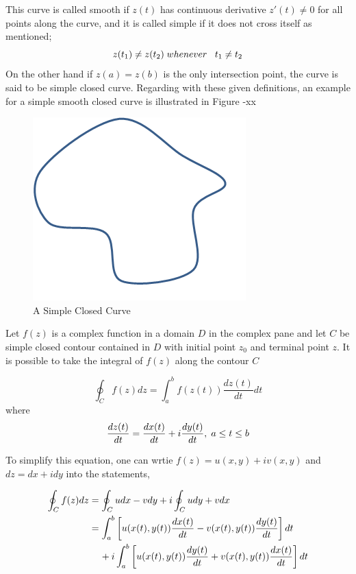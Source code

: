 \documentclass[twoside]{article}
\begin{document}
		This curve is called smooth if $z(t)$ has continuous derivative $z'(t) \neq 0$ for all points along the curve, and it is called simple if it does not cross itself as mentioned;
		\begin{equation}
z(t_1) \neq z(t_2)   \hspace{0.1cm} whenever   \hspace{0.3cm} t_1\neq t_2
		\end{equation}
		On the other hand if  $z(a)=z(b)$ is the only intersection point, the curve is said to be simple closed curve. Regarding with these given definitions, an example for a  simple smooth closed curve is illustrated in Figure -xx
			\begin{figure}[H]
				\caption{A Simple Closed Curve}
				\centering
				\includegraphics[scale = 0.60]{simple_closed_curve}
			\end{figure}

		
		
		Let $f(z)$ is a complex function in a domain $D$ in the complex pane and let $C$ be simple closed contour contained in $D$ with initial point $z_0$ and terminal point  $z$. It is possible to take the integral of $f(z)$ along the contour $C$
		
		\begin{equation}
    \oint_C f(z) dz = \int_{a}^{b} f(z(t))\frac{dz(t)}{dt} dt
		\end{equation}
		where
		\begin{equation}
\frac{dz(t)}{dt} = \frac{dx(t)}{dt} + i\frac{dy(t)}{dt},   \hspace{0.1cm} a\leq t\leq b
		\end{equation}
		
		To simplify this equation, one can wrtie $f(z) = u(x,y) + iv(x,y)$ and $dz = dx + idy$ into the statements,
		
		\begin{align*}
\oint_C f(z)dz & = \oint_C u dx - v dy + i \oint_C u dy + v dx \\
                        &= \int_{a}^{b}\left[u(x(t),y(t) )\frac{dx(t)}{dt} - v(x(t),y(t) )\frac{dy(t)}{dt}\right]dt\\
                        & \hspace{0.4cm} + i\int_{a}^{b} \left[u(x(t),y(t) )\frac{dy(t)}{dt} + v(x(t),y(t) )\frac{dx(t)}{dt}\right]dt
		\end{align*}
		
\end{document}
